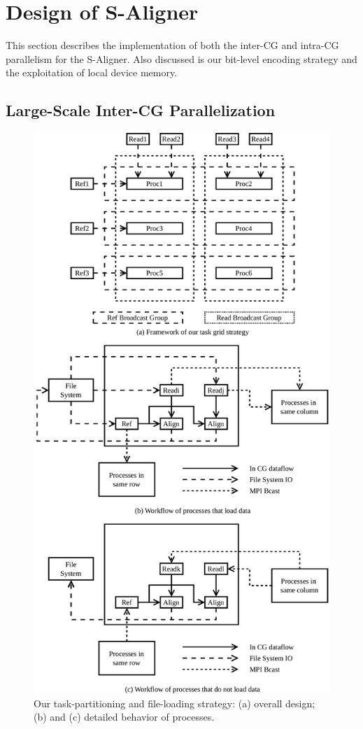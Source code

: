 \section{Design of S-Aligner}
\label{Implementation}

This section describes the implementation of both the inter-CG and
intra-CG parallelism for the S-Aligner. Also discussed is our
bit-level encoding strategy and the exploitation of local device
memory.

\subsection{Large-Scale Inter-CG Parallelization}

\begin{figure}[!htb]
  \includegraphics[width=\linewidth]{figures/GridNew}
  \caption{Our task-partitioning and file-loading strategy: (a)
    overall design; (b) and (c) detailed behavior of processes.}
  \label{TaskGrid}
\end{figure}

